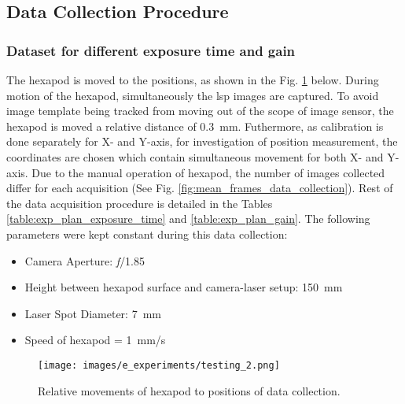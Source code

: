     \subsection*{Data Collection Procedure}\label{subsection:data_collection_procedure}
        \subsubsection{Dataset for different exposure time and gain}
            The hexapod is moved to the positions, as shown in the Fig. \ref{fig:testing_2.png} below. During motion of the hexapod, simultaneously the \gls{lsp} images are captured. To avoid image template being tracked from moving out of the scope of image sensor, the hexapod is moved a relative distance of \SI{0.3}{\milli\meter}. Futhermore, as calibration is done separately for X- and Y-axis, for investigation of position measurement, the coordinates are chosen which contain simultaneous movement for both X- and Y-axis. Due to the manual operation of hexapod, the number of images collected differ for each acquisition (See Fig. \ref{fig:mean_frames_data_collection}). Rest of the data acquisition procedure is detailed in the Tables \ref{table:exp_plan_exposure_time} and \ref{table:exp_plan_gain}. The following parameters were kept constant during this data collection:
            
            \begin{itemize}
                \item Camera Aperture: \emph{f}/1.85
                \item Height between hexapod surface and camera-laser setup: \SI{150}{\milli\meter}
                \item Laser Spot Diameter: \SI{7}{\milli\meter}
                \item Speed of hexapod = \SI{1}{\milli\meter/\second}
            \end{itemize}

            \begin{figure}[ht]
                \centering
                \texttt{[image: images/e\_experiments/testing\_2.png]}
                \caption{Relative movements of hexapod to positions of data collection.}
                \label{fig:testing_2.png}
            \end{figure}

